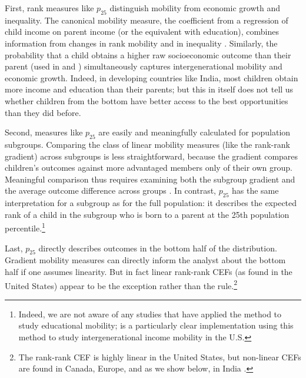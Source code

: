 \documentclass[12pt,letterpaper]{article}
\numberwithin{equation}{section}
\begin{document}
First, rank measures like $p_{25}$ distinguish mobility from economic growth and inequality. The canonical mobility measure, the coefficient from a regression of child income on parent income (or the equivalent with education), combines information from changes in rank mobility and in inequality \cite{chetty2014b}. Similarly, the probability that a child obtains a higher raw socioeconomic outcome than their parent (used in  and ) simultaneously captures intergenerational mobility and economic growth. Indeed, in developing countries like India, most children obtain more income and education than their parents; but this in itself does not tell us whether children from the bottom have better access to the best opportunities than they did before.


Second, measures like $p_{25}$ are easily and meaningfully calculated for population subgroups. Comparing the class of linear mobility measures (like the rank-rank gradient) across subgroups is less straightforward, because the gradient compares children's outcomes against more advantaged members only of their own group. Meaningful comparison thus requires examining both the subgroup gradient and the average outcome difference across groups \cite{hertz2008a,jacome2021}. In contrast, $p_{25}$ has the same interpretation for a subgroup as for the full population: it describes the expected rank of a child in the subgroup who is born to a parent at the 25th population percentile.\footnote{Indeed, we are not aware of any studies that have applied the  method to study educational mobility;  is a particularly clear implementation using this method to study intergenerational income mobility in the U.S.} 

Last, $p_{25}$ directly describes outcomes in the bottom half of the distribution. Gradient mobility measures can directly inform the analyst about the bottom half if one assumes linearity. But in fact linear rank-rank CEFs (as found in the United States) appear to be the exception rather than the rule.\footnote{The rank-rank CEF is highly linear in the United States, but non-linear CEFs are found in Canada, Europe, and as we show below, in India \cite{bratsberg2007,boserup2014,bratberg2017,connolly2019}.} 
\end{document}
